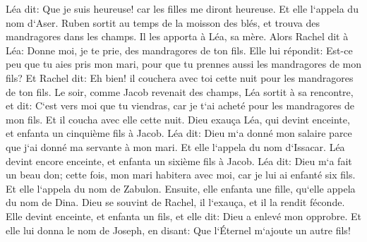 \verse Léa dit: Que je suis heureuse! car les filles me diront heureuse. Et elle l`appela du nom d`Aser. 
\verse Ruben sortit au temps de la moisson des blés, et trouva des mandragores dans les champs. Il les apporta à Léa, sa mère. Alors Rachel dit à Léa: Donne moi, je te prie, des mandragores de ton fils. 
\verse Elle lui répondit: Est-ce peu que tu aies pris mon mari, pour que tu prennes aussi les mandragores de mon fils? Et Rachel dit: Eh bien! il couchera avec toi cette nuit pour les mandragores de ton fils. 
\verse Le soir, comme Jacob revenait des champs, Léa sortit à sa rencontre, et dit: C`est vers moi que tu viendras, car je t`ai acheté pour les mandragores de mon fils. Et il coucha avec elle cette nuit. 
\verse Dieu exauça Léa, qui devint enceinte, et enfanta un cinquième fils à Jacob. 
\verse Léa dit: Dieu m`a donné mon salaire parce que j`ai donné ma servante à mon mari. Et elle l`appela du nom d`Issacar. 
\verse Léa devint encore enceinte, et enfanta un sixième fils à Jacob. 
\verse Léa dit: Dieu m`a fait un beau don; cette fois, mon mari habitera avec moi, car je lui ai enfanté six fils. Et elle l`appela du nom de Zabulon. 
\verse Ensuite, elle enfanta une fille, qu`elle appela du nom de Dina. 
\verse Dieu se souvint de Rachel, il l`exauça, et il la rendit féconde. 
\verse Elle devint enceinte, et enfanta un fils, et elle dit: Dieu a enlevé mon opprobre. 
\verse Et elle lui donna le nom de Joseph, en disant: Que l`Éternel m`ajoute un autre fils! 

